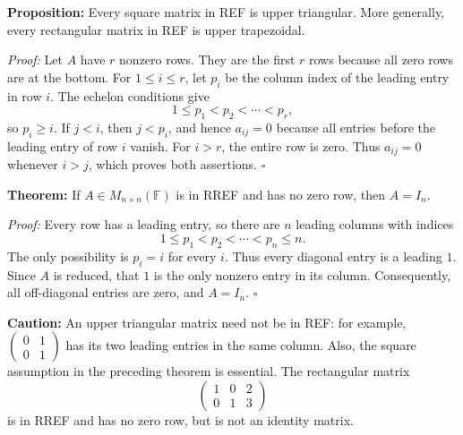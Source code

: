 \documentclass[a4paper,11pt,abstract=true]{scrartcl}
\theoremstyle{dotlessP}
\theoremstyle{dotlessS}
\theoremstyle{remark}
\theoremstyle{definition}
\begin{document}
\begin{problem_box}
\textbf{Proposition:} Every
square matrix in REF is upper triangular. More generally, every
rectangular matrix in REF is upper trapezoidal.

\end{problem_box}

\begin{claim_box}
\textit{Proof:} Let $A$ have $r$ nonzero rows. They are the first $r$
rows because all zero rows are at the bottom. For $1\leq i\leq r$,
let $p_i$ be the column index of the leading entry in row $i$.
The echelon conditions give
\[
1\leq p_1<p_2<\cdots<p_r,
\]
so $p_i\geq i$. If $j<i$, then $j<p_i$, and hence $a_{ij}=0$
because all entries before the leading entry of row $i$ vanish.
For $i>r$, the entire row is zero. Thus $a_{ij}=0$ whenever $i>j$,
which proves both assertions. \hfill$\square$
\end{claim_box}

\begin{problem_box}
\textbf{Theorem:} If
$A\in M_{n\times n}(\mathbb{F})$ is in RREF and has no zero row,
then $A=I_n$.

\end{problem_box}

\begin{claim_box}
\textit{Proof:} Every row has a leading entry, so there are $n$
leading columns with indices
\[
1\leq p_1<p_2<\cdots<p_n\leq n.
\]
The only possibility is $p_i=i$ for every $i$. Thus every diagonal
entry is a leading $1$. Since $A$ is reduced, that $1$ is the only
nonzero entry in its column. Consequently, all off-diagonal entries
are zero, and $A=I_n$. \hfill$\square$
\end{claim_box}

\begin{remark_box}
\textbf{Caution:} An upper triangular
matrix need not be in REF\@: for example,
$\begin{pmatrix}0&1\\0&1\end{pmatrix}$ has its two leading entries
in the same column. Also, the square assumption in the preceding
theorem is essential. The rectangular matrix
\[
\begin{pmatrix}1&0&2\\0&1&3\end{pmatrix}
\]
is in RREF and has no zero row, but is not an identity matrix.
\end{remark_box}
\end{document}
